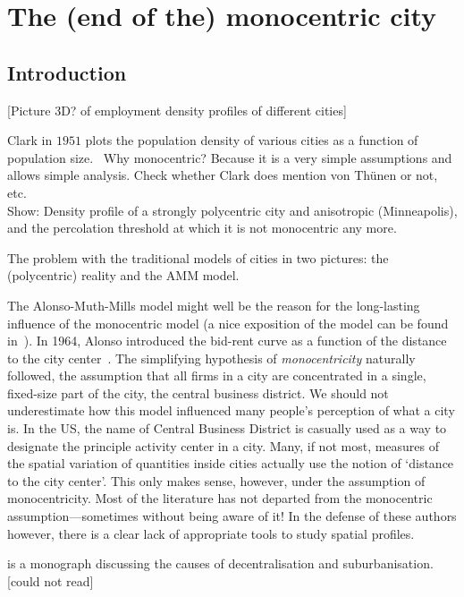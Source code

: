 %
\chapter{The (end of the) monocentric city}
\label{sec:related}


\section{Introduction}
\label{sec:introduction}

[Picture 3D? of employment density profiles of different cities]


Clark in $1951$ plots the population density of various cities as a function of
population size.~\cite{Clark:1951}
Why monocentric? Because it is a very simple assumptions and allows simple
analysis. Check whether Clark does mention von Th\"unen or not, etc.\\


Show: Density profile of a strongly polycentric city and anisotropic
(Minneapolis), and the percolation threshold at which it is not monocentric any
more.

The problem with the traditional models of cities in two pictures: the
(polycentric) reality and the AMM model.


The Alonso-Muth-Mills model might well be the reason for the long-lasting influence of
the monocentric model (a nice exposition of the model can be found
in~\cite{Fujita:1989}). In 1964, Alonso introduced the bid-rent curve as a
function of the distance to the city center~\cite{Alonso:1964}. The simplifying hypothesis of
\emph{monocentricity} naturally followed, the assumption that all firms in a
city are concentrated in a single, fixed-size part of the city, the central business
district. We should not underestimate how this model influenced many people's
perception of what a city is. In the US, the name of Central Business District
is casually used as a way to designate the principle activity center in a city.
Many, if not most, measures of the spatial variation of quantities inside cities
actually use the notion of `distance to the city center'. This only makes sense,
however, under the assumption of monocentricity. Most of the
literature has not departed from the monocentric assumption---sometimes without
being aware of it! In the defense of these authors however, there is a clear
lack of appropriate tools to study spatial profiles.


\cite{Mills:1972} is a monograph discussing the causes of decentralisation and
suburbanisation. [could not read]

